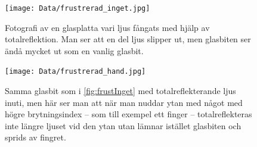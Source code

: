 \documentclass[a4paper]{article}
\begin{document}
\FloatBarrier

\begin{figure}[h]
	\centering
	\texttt{[image: Data/frustrerad\_inget.jpg]}
	\caption{Fotografi av en glasplatta vari ljus fångats med hjälp av totalreflektion. Man ser att en del ljus slipper ut, men glasbiten ser ändå mycket ut som en vanlig glasbit.}
	\label{fig:frustInget}
\end{figure}
\begin{figure}[h]
	\centering
	\texttt{[image: Data/frustrerad\_hand.jpg]}
	\caption{Samma glasbit som i \autoref{fig:frustInget} med totalreflekterande ljus inuti, men här ser man att när man nuddar ytan med något med högre brytningsindex -- som till exempel ett finger -- totalreflekteras inte längre ljuset vid den ytan utan lämnar istället glasbiten och sprids av fingret.}
	\label{fig:frustHand}
\end{figure}
\end{document}
